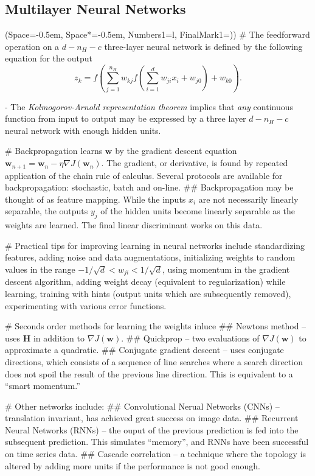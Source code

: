 \documentclass[12pt, a4paper]{article}
\newcommand{\listSpace}{-0.5em}%
\newcommand{\vect}[1]{\bm{#1}}
\begin{document}
\subsection{Multilayer Neural Networks}
\begin{easylist}[itemize]
\ListProperties(Space=\listSpace, Space*=\listSpace, Numbers1=l, FinalMark1={)})
# The feedforward operation on a $d - n_H -c$ three-layer neural network is defined by the following equation for the output
\begin{equation*}
	z_k = f \left( \sum_{j=1}^{n_H} w_{kj} f \left( \sum_{i=1}^{d} w_{ji} x_i + w_{j0} \right) + w_{k0} \right).
\end{equation*}

- The \emph{Kolmogorov-Arnold representation theorem} implies that \emph{any} continuous function from input to output may be expressed by a three layer $d - n_H - c$ neural network with enough hidden units.

# Backpropagation learns $\vect{w}$ by the gradient descent equation $\vect{w}_{n+1} = \vect{w}_{n} - \eta \nabla J(\vect{w}_{n})$. 
The gradient, or derivative, is found by repeated application of the chain rule of calculus.
Several protocols are available for backpropagation: stochastic, batch and on-line.
## Backpropagation may be thought of as feature mapping.
While the inputs $x_i$ are not necessarily linearly separable, the outputs $y_j$ of the hidden units become linearly separable as the weights are learned.
The final linear discriminant works on this data.

# Practical tips for improving learning in neural networks include standardizing features, adding noise and data augmentations, initializing weights to random values in the range $-1 / \sqrt{d} < w_{ji} < 1 / \sqrt{d}$, using momentum in the gradient descent algorithm, adding weight decay (equivalent to regularization) while learning, training with hints (output units which are subsequently removed), experimenting with various error functions.

# Seconds order methods for learning the weights inluce
## Newtons method -- uses $\vect{H}$ in addition to $\nabla J(\vect{w})$.
## Quickprop -- two evaluations of $\nabla J(\vect{w})$ to approximate a quadratic.
## Conjugate gradient descent -- uses conjugate directions, which consists of a sequence of line searches where a search direction does not spoil the result of the previous line direction.
This is equivalent to a ``smart momentum.''

# Other networks include:
## Convolutional Nerual Networks (CNNs) -- translation invariant, has achieved great success on image data.
## Recurrent Neural Networks (RNNs) -- the ouput of the previous prediction is fed into the subsequent prediction. This simulates ``memory'', and RNNs have been successful on time series data.
## Cascade correlation -- a technique where the topology is altered by adding more units if the performance is not good enough.
\end{easylist}
\end{document}
